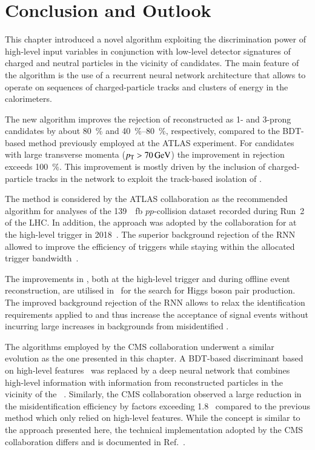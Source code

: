 \section{Conclusion and Outlook}%
\label{sec:tauid_conclusion}

This chapter introduced a novel \tauid algorithm exploiting the
discrimination power of high-level input variables in conjunction with
low-level detector signatures of charged and neutral particles in the
vicinity of \tauhadvis candidates. The main feature of the algorithm
is the use of a recurrent neural network architecture that allows to
operate on sequences of charged-particle tracks and clusters of energy
in the calorimeters.

The new algorithm improves the rejection of \faketauhadvis
reconstructed as 1- and 3-prong \tauhadvis candidates by about
\SI{80}{\percent} and \SIrange{40}{80}{\percent}, respectively,
compared to the BDT-based method previously employed at the ATLAS
experiment. For \tauhadvis candidates with large transverse momenta
($\pT > \SI{70}{\GeV}$) the improvement in \faketauhadvis rejection
exceeds \SI{100}{\percent}. This improvement is mostly driven by the
inclusion of charged-particle tracks in the network to exploit the
track-based isolation of \tauhadvis.

The method is considered by the ATLAS collaboration as the recommended
\tauid algorithm for analyses of the \SI{139}{\per\femto\barn}
$pp$-collision dataset recorded during Run~2 of the LHC. In addition,
the approach was adopted by the collaboration for \tauid at the
high-level trigger in 2018~\cite{ATL-DAQ-PUB-2019-001}. The superior
background rejection of the RNN \tauid allowed to improve the
efficiency of \tauhadvis triggers while staying within the allocated
trigger bandwidth~\cite{ATL-DAQ-PUB-2019-001}.

The improvements in \tauid, both at the high-level trigger and during
offline event reconstruction, are utilised in~ for
the search for Higgs boson pair production. The improved background
rejection of the RNN allows to relax the identification requirements
applied to \tauhadvis and thus increase the acceptance of signal
events without incurring large increases in backgrounds from
misidentified \tauhadvis.

The \tauid algorithms employed by the CMS collaboration underwent a
similar evolution as the one presented in this chapter. A BDT-based
discriminant based on high-level features~\cite{CMS-TAU-16-003} was
replaced by a deep neural network that combines high-level information
with information from reconstructed particles in the vicinity of the
\tauhadvis~\cite{CMS-TAU-20-001}. Similarly, the CMS collaboration
observed a large reduction in the \faketauhadvis misidentification
efficiency by factors exceeding 1.8~\cite{CMS-TAU-20-001} compared to
the previous method which only relied on high-level features. While
the concept is similar to the approach presented here, the technical
implementation adopted by the CMS collaboration differs and is
documented in Ref.~\cite{CMS-TAU-20-001}.

